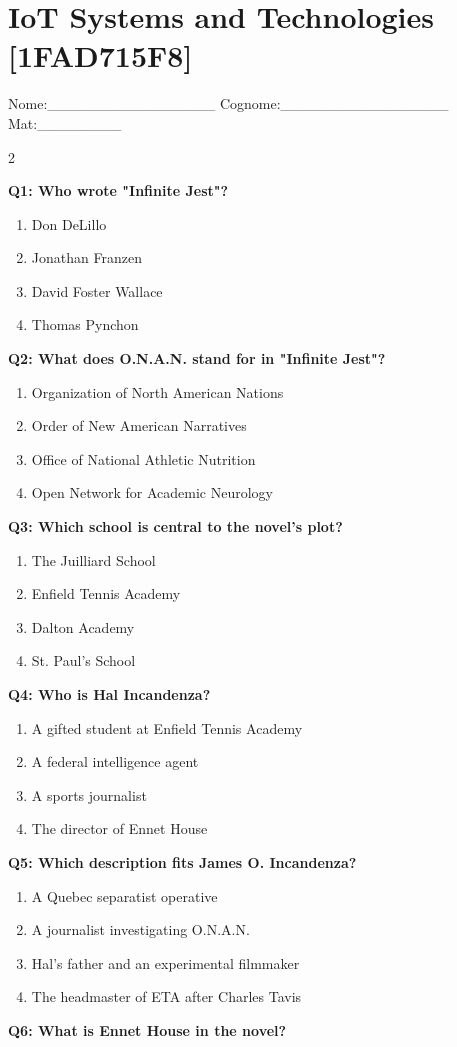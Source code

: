 \documentclass[10pt]{article}
\begin{document}
\section*{IoT Systems and Technologies \footnotesize [1FAD715F8]}
{\footnotesize Nome:\_\_\_\_\_\_\_\_\_\_\_\_\_\_\_\_ Cognome:\_\_\_\_\_\_\_\_\_\_\_\_\_\_\_\_ Mat:\_\_\_\_\_\_\_\_}
\begin{multicols}{2}

\textbf{Q1: Who wrote "Infinite Jest"?}

\begin{enumerate}[label=\arabic*.]
\item Don DeLillo
\item Jonathan Franzen
\item David Foster Wallace
\item Thomas Pynchon
\end{enumerate}
\textbf{Q2: What does O.N.A.N. stand for in "Infinite Jest"?}

\begin{enumerate}[label=\arabic*.]
\item Organization of North American Nations
\item Order of New American Narratives
\item Office of National Athletic Nutrition
\item Open Network for Academic Neurology
\end{enumerate}
\textbf{Q3: Which school is central to the novel's plot?}

\begin{enumerate}[label=\arabic*.]
\item The Juilliard School
\item Enfield Tennis Academy
\item Dalton Academy
\item St. Paul's School
\end{enumerate}
\textbf{Q4: Who is Hal Incandenza?}

\begin{enumerate}[label=\arabic*.]
\item A gifted student at Enfield Tennis Academy
\item A federal intelligence agent
\item A sports journalist
\item The director of Ennet House
\end{enumerate}
\textbf{Q5: Which description fits James O. Incandenza?}

\begin{enumerate}[label=\arabic*.]
\item A Quebec separatist operative
\item A journalist investigating O.N.A.N.
\item Hal's father and an experimental filmmaker
\item The headmaster of ETA after Charles Tavis
\end{enumerate}
\textbf{Q6: What is Ennet House in the novel?}


\end{multicols}
\end{document}
